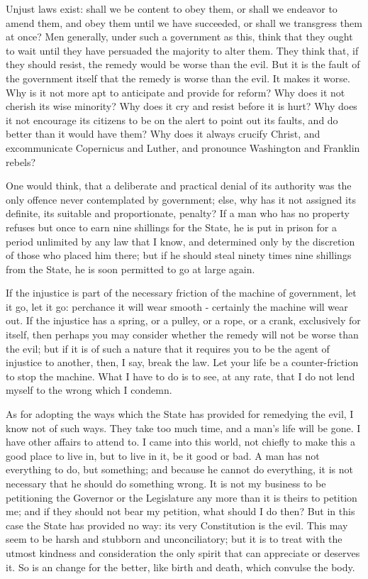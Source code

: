 \documentclass[letterpaper,12pt,english]{sphinxmanual}
\begin{document}
Unjust laws exist: shall we be content to obey them, or shall we endeavor to amend them, and obey them until we have succeeded, or shall we transgress them at once? Men generally, under such a government as this, think that they ought to wait until they have persuaded the majority to alter them. They think that, if they should resist, the remedy would be worse than the evil. But it is the fault of the government itself that the remedy is worse than the evil. It makes it worse. Why is it not more apt to anticipate and provide for reform? Why does it not cherish its wise minority? Why does it cry and resist before it is hurt? Why does it not encourage its citizens to be on the alert to point out its faults, and do better than it would have them? Why does it always crucify Christ, and excommunicate Copernicus and Luther, and pronounce Washington and Franklin rebels?

One would think, that a deliberate and practical denial of its authority was the only offence never contemplated by government; else, why has it not assigned its definite, its suitable and proportionate, penalty? If a man who has no property refuses but once to earn nine shillings for the State, he is put in prison for a period unlimited by any law that I know, and determined only by the discretion of those who placed him there; but if he should steal ninety times nine shillings from the State, he is soon permitted to go at large again.

If the injustice is part of the necessary friction of the machine of government, let it go, let it go: perchance it will wear smooth - certainly the machine will wear out. If the injustice has a spring, or a pulley, or a rope, or a crank, exclusively for itself, then perhaps you may consider whether the remedy will not be worse than the evil; but if it is of such a nature that it requires you to be the agent of injustice to another, then, I say, break the law. Let your life be a counter-friction to stop the machine. What I have to do is to see, at any rate, that I do not lend myself to the wrong which I condemn.

As for adopting the ways which the State has provided for remedying the evil, I know not of such ways. They take too much time, and a man's life will be gone. I have other affairs to attend to. I came into this world, not chiefly to make this a good place to live in, but to live in it, be it good or bad. A man has not everything to do, but something; and because he cannot do everything, it is not necessary that he should do something wrong. It is not my business to be petitioning the Governor or the Legislature any more than it is theirs to petition me; and if they should not bear my petition, what should I do then? But in this case the State has provided no way: its very Constitution is the evil. This may seem to be harsh and stubborn and unconciliatory; but it is to treat with the utmost kindness and consideration the only spirit that can appreciate or deserves it. So is an change for the better, like birth and death, which convulse the body.
\end{document}
